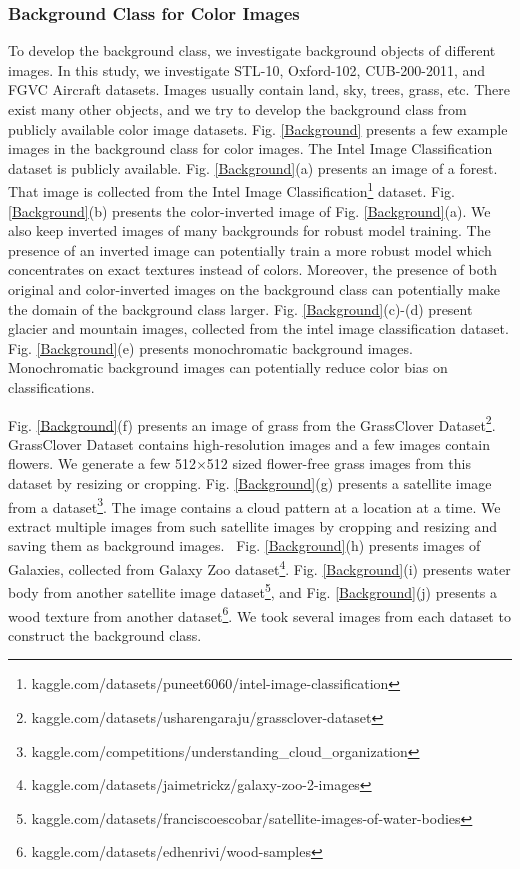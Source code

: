 \documentclass{article}
\begin{document}
\subsubsection{Background Class for Color Images}
To develop the background class, we investigate background objects of different images. In this study, we investigate STL-10, Oxford-102, CUB-200-2011, and FGVC Aircraft datasets. Images usually contain land, sky, trees, grass, etc. There exist many other objects, and we try to develop the background class from publicly available color image datasets. Fig. \ref{Background} presents a few example images in the background class for color images. The Intel Image Classification dataset is publicly available.  Fig. \ref{Background}(a) presents an image of a forest. That image is collected from the Intel Image Classification\footnote{kaggle.com/datasets/puneet6060/intel-image-classification} dataset. Fig. \ref{Background}(b) presents the color-inverted image of Fig. \ref{Background}(a). We also keep inverted images of many backgrounds for robust model training. The presence of an inverted image can potentially train a more robust model which concentrates on exact textures instead of colors. Moreover, the presence of both original and color-inverted images on the background class can potentially make the domain of the background class larger. Fig. \ref{Background}(c)-(d) present glacier and mountain images, collected from the intel image classification dataset.
Fig. \ref{Background}(e) presents monochromatic background images. Monochromatic background images can potentially reduce color bias on classifications. 

Fig. \ref{Background}(f) presents an image of grass from the GrassClover Dataset\footnote{kaggle.com/datasets/usharengaraju/grassclover-dataset}. GrassClover Dataset contains high-resolution images and a few images contain flowers. We generate a few 512$\times$512 sized flower-free grass images from this dataset by resizing or cropping.
Fig. \ref{Background}(g) presents a satellite image from a dataset\footnote{kaggle.com/competitions/understanding\_cloud\_organization}. The image contains a cloud pattern at a location at a time. We extract multiple images from such satellite images by cropping and resizing and saving them as background images.  Fig. \ref{Background}(h) presents images of Galaxies, collected from Galaxy Zoo dataset\footnote{kaggle.com/datasets/jaimetrickz/galaxy-zoo-2-images}.
Fig. \ref{Background}(i) presents water body from another satellite image dataset\footnote{kaggle.com/datasets/franciscoescobar/satellite-images-of-water-bodies}, and Fig. \ref{Background}(j) presents a wood texture from another dataset\footnote{kaggle.com/datasets/edhenrivi/wood-samples}. We took several images from each dataset to construct the background class. 
\end{document}
